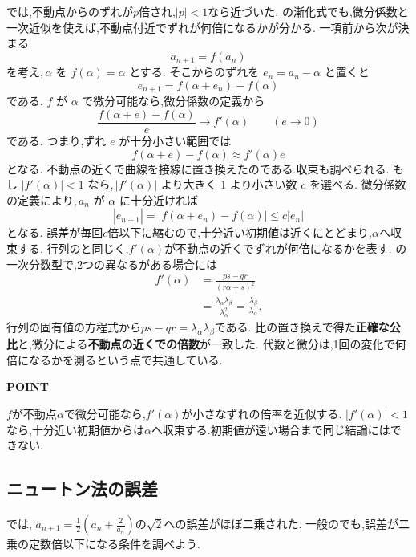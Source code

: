 では,不動点からのずれが$p$倍され,$|p|<1$なら近づいた.
の漸化式でも,微分係数と一次近似を使えば,不動点付近でずれが何倍になるかが分かる.
一項前から次が決まる
\[
  a_{n+1}=f(a_n)
\]
を考え,$\,\alpha$ を $f(\alpha)=\alpha$ とする.
そこからのずれを $e_n=a_n-\alpha$ と置くと
\[
  e_{n+1}=f(\alpha+e_n)-f(\alpha)
\]
である.
$f$ が $\alpha$ で微分可能なら,微分係数の定義から
\[
  \frac{f(\alpha+e)-f(\alpha)}{e}\longrightarrow f'(\alpha)
  \qquad(e\longrightarrow0)
\]
である.
つまり,ずれ $e$ が十分小さい範囲では
\[
  f(\alpha+e)-f(\alpha)\approx f'(\alpha)e
\]
となる.
不動点の近くで曲線を接線に置き換えたのである.収束も調べられる.
もし $|f'(\alpha)|<1$ なら,$\,|f'(\alpha)|$ より大きく $1$ より小さい数 $c$ を選べる.
微分係数の定義により,$\,a_n$ が $\alpha$ に十分近ければ
\[
  |e_{n+1}|
  =|f(\alpha+e_n)-f(\alpha)|
  \le c|e_n|
\]
となる.
誤差が毎回$c$倍以下に縮むので,十分近い初期値は近くにとどまり,$\alpha$へ収束する.
行列のと同じく,$f'(\alpha)$が不動点の近くでずれが何倍になるかを表す.
の一次分数型で,2つの異なるがある場合には
\[
  \begin{aligned}
    f'(\alpha)
    &=\frac{ps-qr}{(r\alpha+s)^2}\\
    &=\frac{\lambda_\alpha\lambda_\beta}{\lambda_\alpha^2}
    =\frac{\lambda_\beta}{\lambda_\alpha}.
  \end{aligned}
\]
行列の固有値の方程式から$ps-qr=\lambda_\alpha\lambda_\beta$である.
比の置き換えで得た\textbf{正確な公比}と,微分による\textbf{不動点の近くでの倍数}が一致した.
代数と微分は,1回の変化で何倍になるかを測るという点で共通している.

\begin{bookpoint}
  \textbf{POINT}\par
  $f$が不動点$\alpha$で微分可能なら,$f'(\alpha)$が小さなずれの倍率を近似する.
  $|f'(\alpha)|<1$なら,十分近い初期値からは$\alpha$へ収束する.初期値が遠い場合まで同じ結論にはできない.
\end{bookpoint}

\subsection{ニュートン法の誤差}
では,\BookMathLayout{}{\\}%
$a_{n+1}=\frac12\left(a_n+\frac{2}{a_n}\right)$の$\sqrt2$への誤差がほぼ二乗された.
一般のでも,誤差が二乗の定数倍以下になる条件を調べよう.

